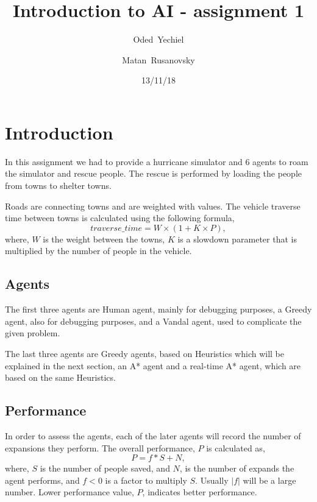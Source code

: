 \documentclass{article}                     %
\begin{document}
	
	\title{Introduction to AI - assignment 1}
	
	
	\author{Oded~Yechiel         \and
		Matan~Rusanovsky
	}
	
	\date{13/11/18}
	
	\maketitle
	
	\section{Introduction}
	In this assignment we had to provide a hurricane simulator and 6 agents to roam the simulator and rescue people. The rescue is performed by loading the people from towns to shelter towns.
	
	Roads are connecting towns and are weighted with values. The vehicle traverse time between towns is calculated using the following formula, 
	\begin{equation}\label{eq:traverse_time}
	traverse\_time = W \times (1 + K \times P), 
	\end{equation}
	where, $ W $ is the weight between the towns, $ K $ is a slowdown parameter that is multiplied by the number of people in the vehicle.
	
	\subsection{Agents}
	The first three agents are Human agent, mainly for debugging purposes, a Greedy agent, also for debugging purposes, and a Vandal agent, used to complicate the given problem.
	
	The last three agents are Greedy agents, based on Heuristics which will be explained in the next section, an A* agent and a real-time A* agent, which are based on the same Heuristics.
	
	\subsection{Performance}
	In order to assess the agents, each of the later agents will record the number of expansions they perform. 
	The overall performance, $ P $ is calculated as,
	\begin{equation}\label{eq:performance}
	P = f * S + N, 
	\end{equation}
	where, $ S $ is the number of people saved, and $ N $, is the number of expands the agent performs, and $ f < 0 $ is a factor to multiply $ S $. Usually $ | f | $ will be a large number.
	Lower performance value, $ P $, indicates better performance.
	\\
	\\
	
\end{document}
